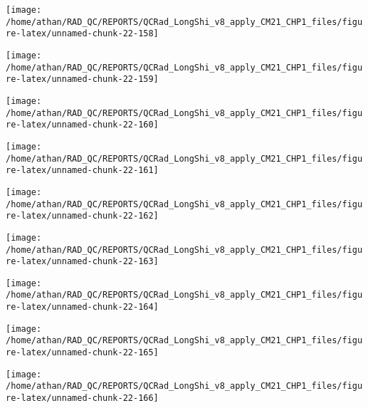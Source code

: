 \documentclass[
  10pt,
  a4paper,oneside]{article}
\begin{document}
\begin{center}\texttt{[image: /home/athan/RAD\_QC/REPORTS/QCRad\_LongShi\_v8\_apply\_CM21\_CHP1\_files/figure-latex/unnamed-chunk-22-158]} \end{center}

\begin{center}\texttt{[image: /home/athan/RAD\_QC/REPORTS/QCRad\_LongShi\_v8\_apply\_CM21\_CHP1\_files/figure-latex/unnamed-chunk-22-159]} \end{center}

\begin{center}\texttt{[image: /home/athan/RAD\_QC/REPORTS/QCRad\_LongShi\_v8\_apply\_CM21\_CHP1\_files/figure-latex/unnamed-chunk-22-160]} \end{center}

\begin{center}\texttt{[image: /home/athan/RAD\_QC/REPORTS/QCRad\_LongShi\_v8\_apply\_CM21\_CHP1\_files/figure-latex/unnamed-chunk-22-161]} \end{center}

\begin{center}\texttt{[image: /home/athan/RAD\_QC/REPORTS/QCRad\_LongShi\_v8\_apply\_CM21\_CHP1\_files/figure-latex/unnamed-chunk-22-162]} \end{center}

\begin{center}\texttt{[image: /home/athan/RAD\_QC/REPORTS/QCRad\_LongShi\_v8\_apply\_CM21\_CHP1\_files/figure-latex/unnamed-chunk-22-163]} \end{center}

\begin{center}\texttt{[image: /home/athan/RAD\_QC/REPORTS/QCRad\_LongShi\_v8\_apply\_CM21\_CHP1\_files/figure-latex/unnamed-chunk-22-164]} \end{center}

\begin{center}\texttt{[image: /home/athan/RAD\_QC/REPORTS/QCRad\_LongShi\_v8\_apply\_CM21\_CHP1\_files/figure-latex/unnamed-chunk-22-165]} \end{center}

\begin{center}\texttt{[image: /home/athan/RAD\_QC/REPORTS/QCRad\_LongShi\_v8\_apply\_CM21\_CHP1\_files/figure-latex/unnamed-chunk-22-166]} \end{center}
\end{document}
